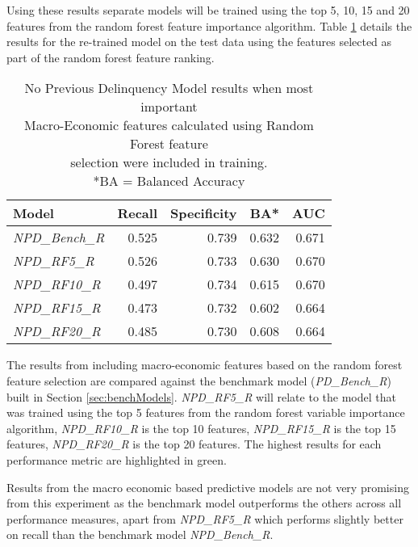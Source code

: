 Using these results separate models will be trained using the top 5, 10, 15 and 20 features from
the random forest feature importance algorithm. Table \ref{table:RFNPDModelResults} details the results for the re-trained model
on the test data using the features selected as part of the random forest feature ranking.

\begin{table}[H]
\centering
\small
		\begin{tabular}{l  r r r r}
\hline
\textbf{Model}  & \textbf{Recall} & \textbf{Specificity} & \textbf{BA*} & \textbf{AUC}  \\ \hline
\textit{NPD\_Bench\_R} & 0.525 & \cellcolor{green!25}0.739 & \cellcolor{green!25}0.632 & \cellcolor{green!25}0.671   \\ \hline
\textit{NPD\_RF5\_R}  & \cellcolor{green!25}0.526 & 0.733 & 0.630 & 0.670   \\ 
\textit{NPD\_RF10\_R} & 0.497 & 0.734 & 0.615 & 0.670 \\ 
\textit{NPD\_RF15\_R} & 0.473 & 0.732 & 0.602 & 0.664  \\
\textit{NPD\_RF20\_R} & 0.485 & 0.730 & 0.608 & 0.664  \\\hline 
		\end{tabular}

	\caption{No Previous Delinquency Model results when most important\\
		Macro-Economic features calculated using Random Forest feature \\selection were included in training.
		\\ *BA = Balanced Accuracy}
	\label{table:RFNPDModelResults}
\end{table}

The results from including macro-economic features based on the random forest feature selection are compared against the benchmark model (\textit{PD\_Bench\_R}) built in Section \ref{sec:benchModels}. \textit{NPD\_RF5\_R} will relate to the model that was trained using the top 5 features from the random forest variable importance algorithm, \textit{NPD\_RF10\_R} is the top 10 features, \textit{NPD\_RF15\_R} is the top 15 features, \textit{NPD\_RF20\_R} is the top 20 features. The highest results for each performance metric are highlighted in green.

Results from the macro economic based predictive models are not very promising from this experiment as the benchmark model outperforms the others across all performance measures, apart from \textit{NPD\_RF5\_R} which performs slightly better on recall than the benchmark model \textit{NPD\_Bench\_R}.



